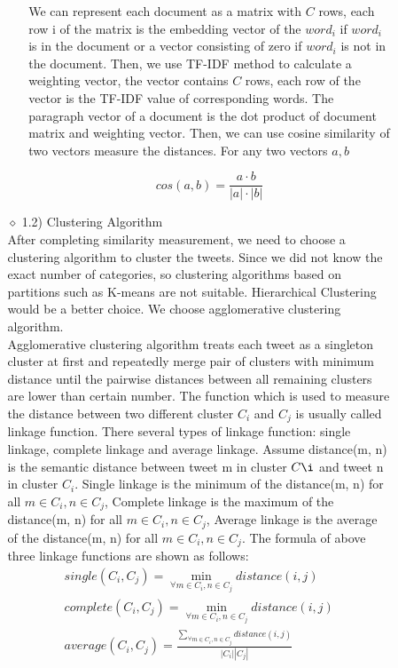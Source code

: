 \documentclass[10pt]{article}
\begin{document}
\begin{itemize}
\begin{itemize}
\begin{itemize}
\begin{itemize}
We can represent each document as a matrix with  $C$ rows, each row i of the matrix is the embedding vector of the $word_i$ if  $word_i$ is in the document or a vector consisting of zero if $word_i$ is not in the document. Then, we use TF-IDF method to calculate a weighting vector, the vector contains  $C$ rows, each row of the vector is the  TF-IDF value of corresponding words.  The paragraph vector of a document is the dot product of document matrix and weighting vector. Then, we can use cosine similarity of two vectors measure the distances. For any two vectors  $a, b$ 

\begin{equation*}
cos(a, b) = \frac{a \cdot b}{|a| \cdot |b|}
\end{equation*}
\end{itemize}

\item[$\diamond$]{1.2) Clustering Algorithm}\\
After completing similarity measurement, we need to choose a clustering algorithm to cluster the tweets. Since we did not know the  exact number of categories, so clustering algorithms based on partitions such as K-means are not suitable. Hierarchical Clustering would be a better choice. We choose agglomerative clustering algorithm. \\

Agglomerative clustering algorithm treats each tweet as a singleton cluster at first and repeatedly merge 
pair of clusters with minimum distance until the pairwise distances between all remaining clusters are lower than certain number. The function which is used to measure the distance between two different cluster $C_i$ and $C_j$ is usually called linkage function. There several types of linkage function: single linkage, complete linkage and average linkage. Assume distance(m, n) is the semantic distance between tweet m in cluster $C\i$ and tweet n in cluster $C_i$. Single linkage is the minimum of the distance(m, n) for all $m \in C_i, n \in C_j $, Complete linkage is the maximum of the distance(m, n) for all $m \in C_i, n \in C_j $, Average linkage is the average of the distance(m, n) for all $m \in C_i, n \in C_j $. The formula of above three linkage functions are shown as follows:
\begin{equation*}
  \begin{aligned}
 single(C_i, C_j) =\min_{\forall m \in C_i, n \in C_j} {distance(i, j)} \\
 complete(C_i, C_j) =\min_{\forall m \in C_i, n \in C_j} {distance(i, j)} \\
average(C_i, C_j) =\frac {\sum\limits_{\forall m \in C_i, n \in C_j} {distance(i, j)}}{|C_i| |C_j|  }
 \end{aligned}
 \end{equation*}


\end{itemize}
\end{itemize}
\end{itemize}
\end{document}
